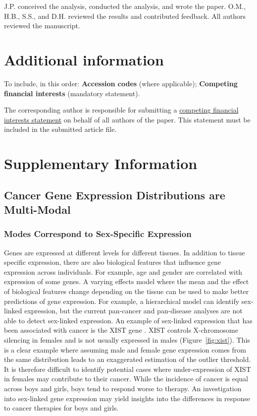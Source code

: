 \documentclass[fleqn,10pt]{wlscirep}
\newcommand{\figref}[1]{Figure~\ref{fig:#1}}
\newcommand{\beginsupplement}{%
        \setcounter{table}{0}
        \renewcommand{\thetable}{S\arabic{table}}%
        \setcounter{figure}{0}
        \renewcommand{\thefigure}{S\arabic{figure}}%
     }
\begin{document}
J.P. conceived the analysis, conducted the analysis, and wrote the paper. O.M., H.B., S.S., and D.H. reviewed the results and contributed feedback. All authors reviewed the manuscript. 

\section*{Additional information}

To include, in this order: \textbf{Accession codes} (where applicable); \textbf{Competing financial interests} (mandatory statement). 

The corresponding author is responsible for submitting a \href{http://www.nature.com/srep/policies/index.html#competing}{competing financial interests statement} on behalf of all authors of the paper. This statement must be included in the submitted article file.

\beginsupplement
\section*{Supplementary Information}

\subsection*{Cancer Gene Expression Distributions are Multi-Modal}
\subsubsection*{Modes Correspond to Sex-Specific Expression}
Genes are expressed at different levels for different tissues. In addition to tissue specific expression, there are also biological features that influence gene expression across individuals. For example, age and gender are correlated with expression of some genes. A varying effects model where the mean and the effect of biological features change depending on the tissue can be used to make better predictions of gene expression. For example, a hierarchical model can identify sex-linked expression, but the current pan-cancer and pan-disease analyses are not able to detect sex-linked expression. An example of sex-linked expression that has been associated with cancer is the XIST gene \cite{yildirim2013xist}. XIST controls X-chromosome silencing in females and is not usually expressed in males (\figref{xist}). This is a clear example where assuming male and female gene expression comes from the same distribution leads to an exaggerated estimation of the outlier threshold. It is therefore difficult to identify potential cases where under-expression of XIST in females may contribute to their cancer. While the incidence of cancer is equal across boys and girls, boys tend to respond worse to therapy. An investigation into sex-linked gene expression may yield insights into the differences in response to cancer therapies for boys and girls. 
\end{document}
